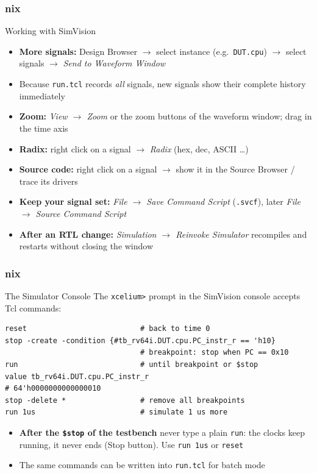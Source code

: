 \documentclass{beamer}
\newcommand{\astitle}{nix}
\newcommand{\assubtitle}{nix}
\newcommand{\cmd}[1]{\texttt{#1}}
\begin{document}
\renewcommand{\assubtitle}{Working with SimVision}
\begin{frame}
\frametitle{\astitle}
\begin{block}{\assubtitle}
  \footnotesize
  \begin{itemize}
    \item \textbf{More signals:} Design Browser $\rightarrow$ select instance
      (e.g.\ \cmd{DUT.cpu}) $\rightarrow$ select signals $\rightarrow$
      \emph{Send to Waveform Window}
    \item Because \cmd{run.tcl} records \emph{all} signals, new signals show
      their complete history immediately
    \item \textbf{Zoom:} \emph{View $\rightarrow$ Zoom} or the zoom buttons
      of the waveform window; drag in the time axis
    \item \textbf{Radix:} right click on a signal $\rightarrow$ \emph{Radix} (hex, dec, ASCII \dots)
    \item \textbf{Source code:} right click on a signal $\rightarrow$
      show it in the Source Browser / trace its drivers
    \item \textbf{Keep your signal set:} \emph{File $\rightarrow$ Save Command Script}
      (\cmd{.svcf}), later \emph{File $\rightarrow$ Source Command Script}
    \item \textbf{After an RTL change:} \emph{Simulation $\rightarrow$ Reinvoke Simulator}
      recompiles and restarts without closing the window
  \end{itemize}
\end{block}
\end{frame}

\renewcommand{\assubtitle}{The Simulator Console}
\begin{frame}[fragile]
\frametitle{\astitle}
\begin{block}{\assubtitle}
  The \cmd{xcelium>} prompt in the SimVision console accepts Tcl commands:
\begin{lstlisting}[style=sh]
reset                          # back to time 0
stop -create -condition {#tb_rv64i.DUT.cpu.PC_instr_r == 'h10}
                               # breakpoint: stop when PC == 0x10
run                            # until breakpoint or $stop
value tb_rv64i.DUT.cpu.PC_instr_r
# 64'h0000000000000010
stop -delete *                 # remove all breakpoints
run 1us                        # simulate 1 us more
\end{lstlisting}
  \begin{itemize}
    \item \textbf{After the \cmd{\$stop} of the testbench} never type a plain
      \cmd{run}: the clocks keep running, it never ends (Stop button).
      Use \cmd{run 1us} or \cmd{reset}
    \item The same commands can be written into \cmd{run.tcl} for batch mode
  \end{itemize}
\end{block}
\end{frame}
\end{document}
